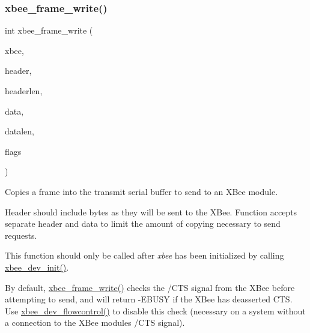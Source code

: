 \subsubsection{\texorpdfstring{xbee\+\_\+frame\+\_\+write()}{xbee\_frame\_write()}}
{\footnotesize\ttfamily int xbee\+\_\+frame\+\_\+write (\begin{DoxyParamCaption}\item[{\hyperlink{structxbee__dev__t}{xbee\+\_\+dev\+\_\+t} $\ast$}]{xbee,  }\item[{const void \hyperlink{group__hal_gaef060b3456fdcc093a7210a762d5f2ed}{F\+AR} $\ast$}]{header,  }\item[{\hyperlink{group__hal__dos_ga5a8b2dc9e45a9ee81a94ef304fb62505}{uint16\+\_\+t}}]{headerlen,  }\item[{const void \hyperlink{group__hal_gaef060b3456fdcc093a7210a762d5f2ed}{F\+AR} $\ast$}]{data,  }\item[{\hyperlink{group__hal__dos_ga5a8b2dc9e45a9ee81a94ef304fb62505}{uint16\+\_\+t}}]{datalen,  }\item[{\hyperlink{group__hal__dos_ga5a8b2dc9e45a9ee81a94ef304fb62505}{uint16\+\_\+t}}]{flags }\end{DoxyParamCaption})}



Copies a frame into the transmit serial buffer to send to an X\+Bee module. 

Header should include bytes as they will be sent to the X\+Bee. Function accepts separate header and data to limit the amount of copying necessary to send requests.

This function should only be called after {\itshape xbee} has been initialized by calling \hyperlink{group__xbee__device_ga550d7c865e75d3fc1df0e64cb880cf3d}{xbee\+\_\+dev\+\_\+init()}.

By default, \hyperlink{group__xbee__device_ga51f281b72bffcc99eec0e8c7f65a5f3f}{xbee\+\_\+frame\+\_\+write()} checks the /\+C\+TS signal from the X\+Bee before attempting to send, and will return -\/\+E\+B\+U\+SY if the X\+Bee has deasserted C\+TS. Use \hyperlink{group__xbee__device_ga75bfe1292b8af0588e0e322a42d3d2dc}{xbee\+\_\+dev\+\_\+flowcontrol()} to disable this check (necessary on a system without a connection to the X\+Bee module\textquotesingle{}s /\+C\+TS signal).


